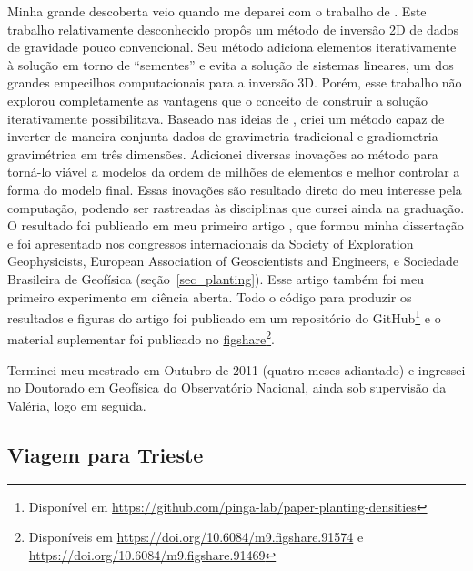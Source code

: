 \documentclass[10pt,a4paper,oneside]{book}
\begin{document}
Minha grande descoberta veio quando me deparei com o trabalho de
\citet{Rene1986}.
Este trabalho relativamente desconhecido propôs um método de inversão 2D de
dados de gravidade pouco convencional.
Seu método adiciona elementos iterativamente à solução em torno de ``sementes''
e evita a solução de sistemas lineares, um dos grandes empecilhos
computacionais para a inversão 3D.
Porém, esse trabalho não explorou completamente as vantagens que o conceito de
construir a solução iterativamente possibilitava.
Baseado nas ideias de \citet{Rene1986}, criei um método capaz de inverter de
maneira conjunta dados de gravimetria tradicional e gradiometria gravimétrica
em três dimensões.
Adicionei diversas inovações ao método para torná-lo viável a modelos da ordem
de milhões de elementos e melhor controlar a forma do modelo final.
Essas inovações são resultado direto do meu interesse pela computação, podendo
ser rastreadas às disciplinas que cursei ainda na graduação.
O resultado foi publicado em meu primeiro artigo \citep{Uieda2012}, que formou minha
dissertação e foi apresentado nos congressos internacionais da
Society of Exploration Geophysicists,
European Association of Geoscientists and Engineers,
e Sociedade Brasileira de Geofísica
(seção~\ref{sec_planting}).
Esse artigo também foi meu primeiro experimento em ciência aberta.
Todo o código para produzir os resultados e figuras do artigo foi publicado
em um repositório do GitHub\footnote{Disponível em
\url{https://github.com/pinga-lab/paper-planting-densities}} e o material
suplementar foi publicado no
\href{https://figshare.com/}{figshare}\footnote{Disponíveis em
\url{https://doi.org/10.6084/m9.figshare.91574} e
\url{https://doi.org/10.6084/m9.figshare.91469}}.

Terminei meu mestrado em Outubro de 2011 (quatro meses adiantado) e ingressei
no Doutorado em Geofísica do Observatório Nacional, ainda sob supervisão da
Valéria, logo em seguida.

\subsection{Viagem para Trieste}
\label{sec_triste_carla}
\end{document}
